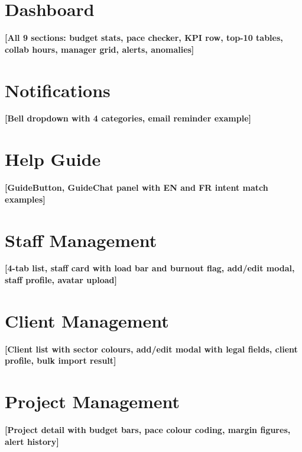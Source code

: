 \documentclass[12pt,a4paper]{report}
\begin{document}
\section*{Dashboard}\label{annex:Dashboard}
\begin{placeholder}\textbf{[All 9 sections: budget stats, pace checker, KPI row, top-10 tables, collab hours, manager grid, alerts, anomalies]}\end{placeholder}

\section*{Notifications}\label{annex:Notifications}
\begin{placeholder}\textbf{[Bell dropdown with 4 categories, email reminder example]}\end{placeholder}

\section*{Help Guide}\label{annex:Help Guide}
\begin{placeholder}\textbf{[GuideButton, GuideChat panel with EN and FR intent match examples]}\end{placeholder}

\section*{Staff Management}\label{annex:Staff Management}
\begin{placeholder}\textbf{[4-tab list, staff card with load bar and burnout flag, add/edit modal, staff profile, avatar upload]}\end{placeholder}

\section*{Client Management}\label{annex:Client Management}
\begin{placeholder}\textbf{[Client list with sector colours, add/edit modal with legal fields, client profile, bulk import result]}\end{placeholder}

\section*{Project Management}\label{annex:Project Management}
\begin{placeholder}\textbf{[Project detail with budget bars, pace colour coding, margin figures, alert history]}\end{placeholder}
\end{document}
